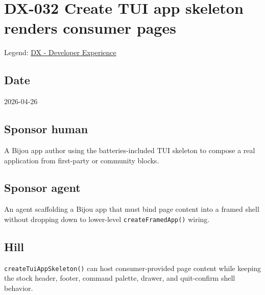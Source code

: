 \chapter{DX-032 Create TUI app skeleton renders consumer pages}\label{record-130}

\smallskip

Legend: \href{https://github.com/flyingrobots/bijou/blob/1853ad902f6bf219326409e7f743a5a1d6517dbc/docs/legends/DX-developer-experience.md}{DX - Developer Experience}

\section{Date}\label{record-130-date}

2026-04-26

\section{Sponsor human}\label{record-130-sponsor-human}

A Bijou app author using the batteries-included TUI skeleton to compose a real application from first-party or community blocks.

\section{Sponsor agent}\label{record-130-sponsor-agent}

An agent scaffolding a Bijou app that must bind page content into a framed shell without dropping down to lower-level \texttt{c\allowbreak{}r\allowbreak{}e\allowbreak{}a\allowbreak{}t\allowbreak{}e\allowbreak{}F\allowbreak{}r\allowbreak{}a\allowbreak{}m\allowbreak{}e\allowbreak{}d\allowbreak{}A\allowbreak{}p\allowbreak{}p\allowbreak{}(\allowbreak{})} wiring.

\section{Hill}\label{record-130-hill}

\texttt{c\allowbreak{}r\allowbreak{}e\allowbreak{}a\allowbreak{}t\allowbreak{}e\allowbreak{}T\allowbreak{}u\allowbreak{}i\allowbreak{}A\allowbreak{}p\allowbreak{}p\allowbreak{}S\allowbreak{}k\allowbreak{}e\allowbreak{}l\allowbreak{}e\allowbreak{}t\allowbreak{}o\allowbreak{}n\allowbreak{}(\allowbreak{})} can host consumer-provided page content while keeping the stock header, footer, command palette, drawer, and quit-confirm shell behavior.

